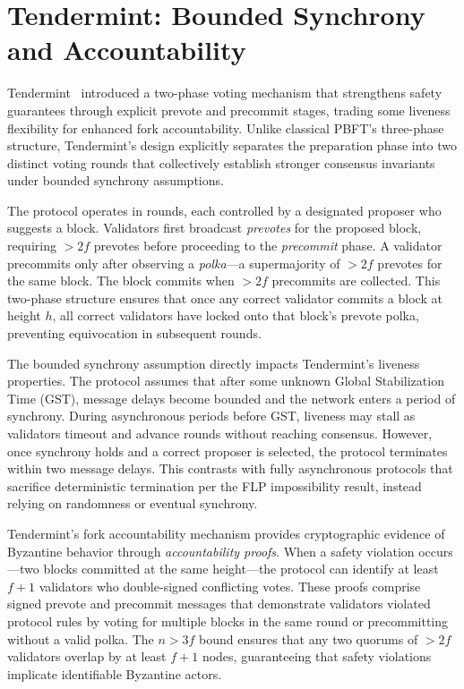 \section{Tendermint: Bounded Synchrony and Accountability}

Tendermint~\cite{buchman2016tendermint} introduced a two-phase voting mechanism that strengthens safety guarantees through explicit prevote and precommit stages, trading some liveness flexibility for enhanced fork accountability. Unlike classical PBFT's three-phase structure, Tendermint's design explicitly separates the preparation phase into two distinct voting rounds that collectively establish stronger consensus invariants under bounded synchrony assumptions.

The protocol operates in rounds, each controlled by a designated proposer who suggests a block. Validators first broadcast \emph{prevotes} for the proposed block, requiring $> 2f$ prevotes before proceeding to the \emph{precommit} phase. A validator precommits only after observing a \emph{polka}---a supermajority of $> 2f$ prevotes for the same block. The block commits when $> 2f$ precommits are collected. This two-phase structure ensures that once any correct validator commits a block at height $h$, all correct validators have locked onto that block's prevote polka, preventing equivocation in subsequent rounds.

The bounded synchrony assumption directly impacts Tendermint's liveness properties. The protocol assumes that after some unknown Global Stabilization Time (GST), message delays become bounded and the network enters a period of synchrony. During asynchronous periods before GST, liveness may stall as validators timeout and advance rounds without reaching consensus. However, once synchrony holds and a correct proposer is selected, the protocol terminates within two message delays. This contrasts with fully asynchronous protocols that sacrifice deterministic termination per the FLP impossibility result, instead relying on randomness or eventual synchrony.

Tendermint's fork accountability mechanism provides cryptographic evidence of Byzantine behavior through \emph{accountability proofs}. When a safety violation occurs---two blocks committed at the same height---the protocol can identify at least $f+1$ validators who double-signed conflicting votes. These proofs comprise signed prevote and precommit messages that demonstrate validators violated protocol rules by voting for multiple blocks in the same round or precommitting without a valid polka. The $n > 3f$ bound ensures that any two quorums of $> 2f$ validators overlap by at least $f+1$ nodes, guaranteeing that safety violations implicate identifiable Byzantine actors.

